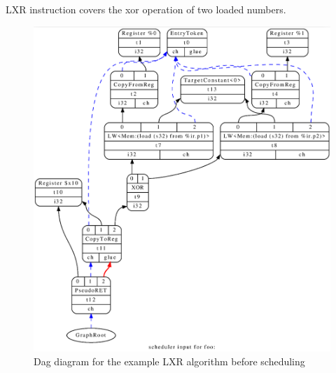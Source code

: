 LXR instruction covers the xor operation of two loaded numbers.
\\

\begin{figure}
    \centering
    \includegraphics[scale=0.3]{adding_new_instr/lxr_sched.png}
    \caption{Dag diagram for the example LXR algorithm before scheduling}
    \label{fig:lxr_sched_diagram}
\end{figure}


